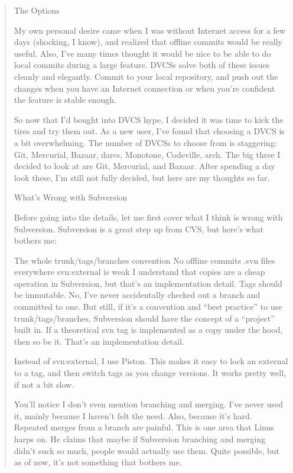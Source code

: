 \begin{enumerate}
\begin{quote}
            The Options

            My own personal desire came when I was without Internet access for a few days (shocking, I know), and realized that offline commits would be really useful. Also, I’ve many times thought it would be nice to be able to do local commits during a large feature. DVCSs solve both of these issues cleanly and elegantly. Commit to your local repository, and push out the changes when you have an Internet connection or when you’re confident the feature is stable enough.

            So now that I’d bought into DVCS hype, I decided it was time to kick the tires and try them out. As a new user, I’ve found that choosing a DVCS is a bit overwhelming. The number of DVCSs to choose from is staggering: Git, Mercurial, Bazaar, darcs, Monotone, Codeville, arch. The big three I decided to look at are Git, Mercurial, and Bazaar. After spending a day look these, I’m still not fully decided, but here are my thoughts so far.

            What’s Wrong with Subversion

            Before going into the details, let me first cover what I think is wrong with Subversion. Subversion is a great step up from CVS, but here’s what bothers me:

            The whole trunk/tags/branches convention
            No offline commits
            .svn files everywhere
            svn:external is weak
            I understand that copies are a cheap operation in Subversion, but that’s an implementation detail. Tags should be immutable. No, I’ve never accidentally checked out a branch and committed to one. But still, if it’s a convention and “best practice” to use trunk/tags/branches, Subversion should have the concept of a “project” built in. If a theoretical svn tag is implemented as a copy under the hood, then so be it. That’s an implementation detail.

            Instead of svn:external, I use Piston. This makes it easy to lock an external to a tag, and then switch tags as you change versions. It works pretty well, if not a bit slow.

            You’ll notice I don’t even mention branching and merging. I’ve never used it, mainly because I haven’t felt the need. Also, because it’s hard. Repeated merges from a branch are painful. This is one area that Linus harps on. He claims that maybe if Subversion branching and merging didn’t suck so much, people would actually use them. Quite possible, but as of now, it’s not something that bothers me.


\end{quote}
\end{enumerate}
